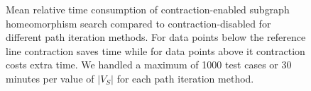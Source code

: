 \begin{figure}
\begin{subfigure} {0.5\linewidth}

\end{subfigure}

\caption{Mean relative time consumption of contraction-enabled subgraph homeomorphism search compared to contraction-disabled for different path iteration methods. For data points below the reference line contraction saves time while for data points above it contraction costs extra time. We handled a maximum of 1000 test cases or 30 minutes per value of $|V_S|$ for each path iteration method.}	
\label{fig:contraction-performance}
\end{figure}


